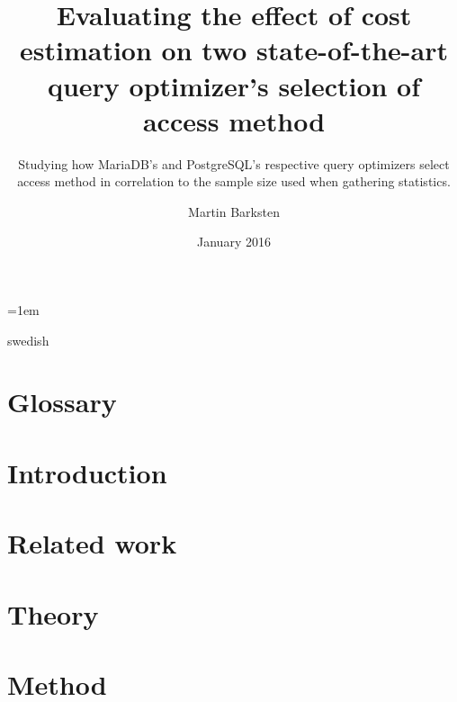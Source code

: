 \documentclass[a4paper,11pt]{kth-mag}
\title{Evaluating the effect of cost estimation on two state-of-the-art query optimizer's selection of access method}
\subtitle{Studying how MariaDB's and PostgreSQL's respective query optimizers select access method in correlation to the sample size used when gathering statistics.}
\author{Martin Barksten}
\date{January 2016}
\begin{document}
\lstset{basicstyle=\ttfamily,breaklines=true}
\lstset{frame=lines}
\emergencystretch=1em
\pgfplotsset{width=10cm, compat=1.9}
\tabulinesep=1.2mm

\newcommand{\clj}[1]{\texttt{#1}}
\newcommand{\sql}[1]{\texttt{#1}}
\newenvironment{indexgraph}{
  \begin{tikzpicture}
    \begin{axis}[
      ybar,
      legend style={at={(0.5,-0.15)},
        anchor=north,legend columns=-1},
      symbolic x coords={ct,t,mt,mm,book,cmt,cmm,est,resamb},
      ylabel={\#index},
      xtick=data,
      nodes near coords,
      nodes near coords align={vertical},
      width=14cm]
} {
  \legend{Possible access methods, MariaDB, PostgreSQL}
\end{axis}
\end{tikzpicture}}

\frontmatter
\pagestyle{empty}
\removepagenumbers
\maketitle
{}
\begin{abstract}
    
\end{abstract}
\clearpage
\begin{foreignabstract}{swedish}
    
\end{foreignabstract}
\clearpage
\tableofcontents*
\clearpage
\listoffigures
\mainmatter
\pagestyle{newchap}

\chapter{Glossary} \label{chap:glossary}
    
\chapter{Introduction} \label{chap:introduction}
    
\chapter{Related work} \label{chap:relatedwork}
    
\chapter{Theory} \label{chap:theory}
    
\chapter{Method} \label{chap:method}
    
\end{document}
